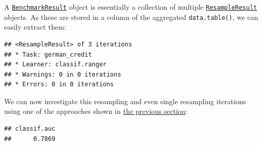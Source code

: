 \documentclass[
]{scrbook}
\newenvironment{Shaded}{\begin{snugshade}}{\end{snugshade}}
\newcommand{\CommentTok}[1]{\textcolor[rgb]{0.56,0.35,0.01}{\textit{#1}}}
\newcommand{\DecValTok}[1]{\textcolor[rgb]{0.00,0.00,0.81}{#1}}
\newcommand{\FunctionTok}[1]{\textcolor[rgb]{0.00,0.00,0.00}{#1}}
\newcommand{\NormalTok}[1]{#1}
\newcommand{\OtherTok}[1]{\textcolor[rgb]{0.56,0.35,0.01}{#1}}
\newcommand{\SpecialCharTok}[1]{\textcolor[rgb]{0.00,0.00,0.00}{#1}}
\newcommand{\StringTok}[1]{\textcolor[rgb]{0.31,0.60,0.02}{#1}}
\renewenvironment{Shaded} {\begin{snugshade}\small} {\end{snugshade}}
\begin{document}
A \href{https://mlr3.mlr-org.com/reference/BenchmarkResult.html}{\texttt{BenchmarkResult}} object is essentially a collection of multiple \href{https://mlr3.mlr-org.com/reference/ResampleResult.html}{\texttt{ResampleResult}} objects.
As these are stored in a column of the aggregated \texttt{data.table()}, we can easily extract them:

\begin{Shaded}
\end{Shaded}

\begin{verbatim}
## <ResampleResult> of 3 iterations
## * Task: german_credit
## * Learner: classif.ranger
## * Warnings: 0 in 0 iterations
## * Errors: 0 in 0 iterations
\end{verbatim}

We can now investigate this resampling and even single resampling iterations using one of the approaches shown in \protect\hyperlink{bm-exec}{the previous section}:

\begin{Shaded}
\end{Shaded}

\begin{verbatim}
## classif.auc 
##      0.7869
\end{verbatim}

\begin{Shaded}
\end{Shaded}
\end{document}
